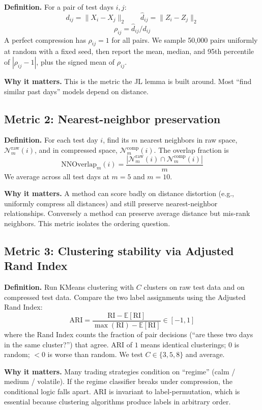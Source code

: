 \documentclass[11pt]{article}
\begin{document}
\textbf{Definition.} For a pair of test days $i, j$:
\[
d_{ij} = \|X_i - X_j\|_2 \qquad \hat d_{ij} = \|Z_i - Z_j\|_2
\]
\[
\rho_{ij} = \hat d_{ij} / d_{ij}
\]
A perfect compression has $\rho_{ij} = 1$ for all pairs. We sample 50{,}000 pairs uniformly at random with a fixed seed, then report the mean, median, and 95th percentile of $|\rho_{ij} - 1|$, plus the signed mean of $\rho_{ij}$.

\textbf{Why it matters.} This is the metric the JL lemma is built around. Most ``find similar past days'' models depend on distance.

\subsection{Metric 2: Nearest-neighbor preservation}

\textbf{Definition.} For each test day $i$, find its $m$ nearest neighbors in raw space, $\mathcal{N}_m^{\mathrm{raw}}(i)$, and in compressed space, $\mathcal{N}_m^{\mathrm{comp}}(i)$. The overlap fraction is
\[
\mathrm{NNOverlap}_m(i) = \frac{|\mathcal{N}_m^{\mathrm{raw}}(i) \cap \mathcal{N}_m^{\mathrm{comp}}(i)|}{m}
\]
We average across all test days at $m = 5$ and $m = 10$.

\textbf{Why it matters.} A method can score badly on distance distortion (e.g., uniformly compress all distances) and still preserve nearest-neighbor relationships. Conversely a method can preserve average distance but mis-rank neighbors. This metric isolates the ordering question.

\subsection{Metric 3: Clustering stability via Adjusted Rand Index}

\textbf{Definition.} Run KMeans clustering with $C$ clusters on raw test data and on compressed test data. Compare the two label assignments using the Adjusted Rand Index:
\[
\mathrm{ARI} = \frac{\mathrm{RI} - \mathbb{E}[\mathrm{RI}]}{\max(\mathrm{RI}) - \mathbb{E}[\mathrm{RI}]} \in [-1, 1]
\]
where the Rand Index counts the fraction of pair decisions (``are these two days in the same cluster?'') that agree. ARI of $1$ means identical clusterings; $0$ is random; $<0$ is worse than random. We test $C \in \{3, 5, 8\}$ and average.

\textbf{Why it matters.} Many trading strategies condition on ``regime'' (calm / medium / volatile). If the regime classifier breaks under compression, the conditional logic falls apart. ARI is invariant to label-permutation, which is essential because clustering algorithms produce labels in arbitrary order.
\end{document}
